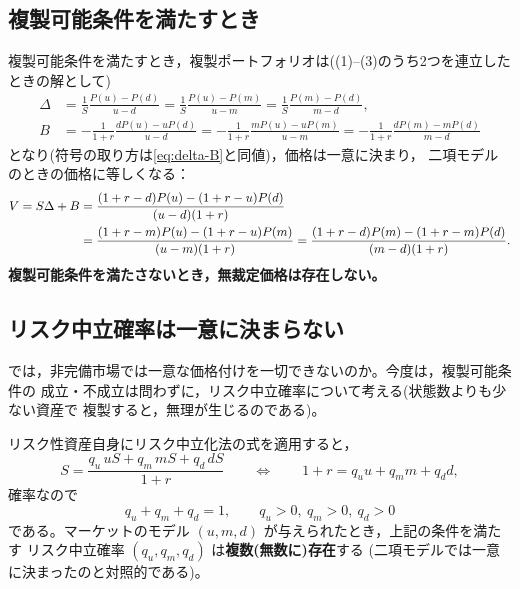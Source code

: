 \subsection{複製可能条件を満たすとき}

複製可能条件を満たすとき，複製ポートフォリオは((1)--(3)のうち2つを連立した
ときの解として)
\begin{align}
\Delta &= \frac{1}{S}\frac{P(u)-P(d)}{u-d}
= \frac{1}{S}\frac{P(u)-P(m)}{u-m}
= \frac{1}{S}\frac{P(m)-P(d)}{m-d},\\
B &= -\frac{1}{1+r}\frac{dP(u)-uP(d)}{u-d}
= -\frac{1}{1+r}\frac{mP(u)-uP(m)}{u-m}
= -\frac{1}{1+r}\frac{dP(m)-mP(d)}{m-d}
\end{align}
となり(符号の取り方は\eqref{eq:delta-B}と同値)，価格は一意に決まり，
二項モデルのときの価格に等しくなる：
\begin{align}
V = S\Delta + B
&= \frac{(1+r-d)P(u) - (1+r-u)P(d)}{(u-d)(1+r)}\notag\\
&= \frac{(1+r-m)P(u) - (1+r-u)P(m)}{(u-m)(1+r)}
= \frac{(1+r-d)P(m) - (1+r-m)P(d)}{(m-d)(1+r)}.
\end{align}
\textbf{複製可能条件を満たさないとき，無裁定価格は存在しない。}

\subsection{リスク中立確率は一意に決まらない}

では，非完備市場では一意な価格付けを一切できないのか。今度は，複製可能条件の
成立・不成立は問わずに，リスク中立確率について考える(状態数よりも少ない資産で
複製すると，無理が生じるのである)。

リスク性資産自身にリスク中立化法の式を適用すると，
\begin{equation}
S = \frac{q_u\,uS + q_m\,mS + q_d\,dS}{1+r}
\qquad\Longleftrightarrow\qquad
1 + r = q_u u + q_m m + q_d d,
\end{equation}
確率なので
\begin{equation}
q_u + q_m + q_d = 1,\qquad q_u > 0,\ q_m > 0,\ q_d > 0
\end{equation}
である。マーケットのモデル $(u,m,d)$ が与えられたとき，上記の条件を満たす
リスク中立確率 $(q_u, q_m, q_d)$ は\textbf{複数(無数に)存在}する
(二項モデルでは一意に決まったのと対照的である)。

